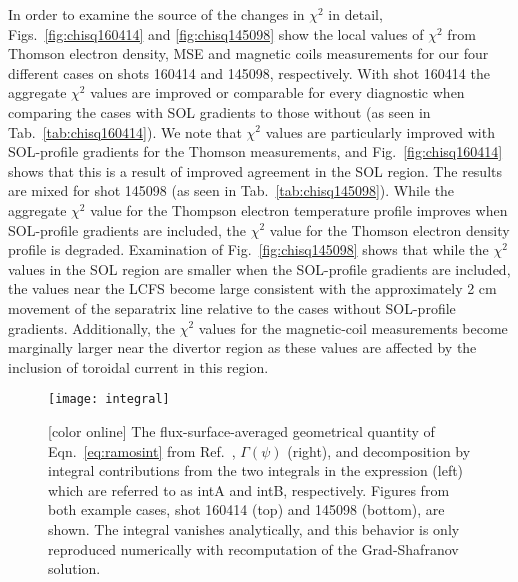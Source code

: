 \documentclass[english,aps,superscriptaddress,showkeys,showpacs,prepri,twocolumn]{revtex4}
\begin{document}
In order to examine the source of the changes in $\chi^2$ in detail,
Figs.~\ref{fig:chisq160414} and \ref{fig:chisq145098} show the local values of
$\chi^2$ from Thomson electron density, MSE and magnetic coils measurements for
our four different cases on shots 160414 and 145098, respectively. With shot
160414 the aggregate $\chi^2$ values are improved or comparable for every
diagnostic when comparing the cases with SOL gradients to those without (as
seen in Tab.~\ref{tab:chisq160414}).  We note that $\chi^2$ values are
particularly improved with SOL-profile gradients for the Thomson measurements,
and Fig.~\ref{fig:chisq160414} shows that this is a result of improved
agreement in the SOL region. The results are mixed for shot 145098 (as seen in
Tab.~\ref{tab:chisq145098}). While the aggregate $\chi^2$ value for the
Thompson electron temperature profile improves when SOL-profile gradients are
included, the $\chi^2$ value for the Thomson electron density profile is
degraded. Examination of Fig.~\ref{fig:chisq145098} shows that while the
$\chi^2$ values in the SOL region are smaller when the SOL-profile gradients
are included, the values near the LCFS become large consistent with the
approximately 2 cm movement of the separatrix line relative to the cases
without SOL-profile gradients. Additionally, the $\chi^2$ values for the
magnetic-coil measurements become marginally larger near the divertor region as
these values are affected by the inclusion of toroidal current in this region.

\begin{figure}
\begin{center}
\texttt{[image: integral]}
\caption{ [color online]
The flux-surface-averaged geometrical quantity of Eqn.~\eqref{eq:ramosint} from
Ref.~\cite{ramos15}, $\Gamma (\psi)$ (right), and decomposition by integral
contributions from the two integrals in the expression (left) which are
referred to as intA and intB, respectively. Figures from both example cases, shot
160414 (top) and 145098 (bottom), are shown. The integral vanishes
analytically, and this behavior is only reproduced numerically with
recomputation of the Grad-Shafranov solution.
}
\label{fig:integrals}
\end{center}
\end{figure}
\end{document}
